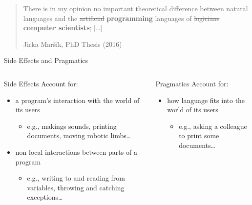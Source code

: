 \documentclass{beamer}
\begin{document}
\begin{frame}
  \begin{center}
    \begin{quotation}
      There is in my opinion no important theoretical difference between
      natural languages and the \sout{artificial} \textbf{programming}
      languages of \sout{logicians} \textbf{computer scientists}; [\ldots]

      \raggedleft \textup{Jirka Maršík}, PhD Thesis (2016)
    \end{quotation}
  \end{center}
\end{frame}


\begin{frame}{Side Effects and Pragmatics}
  \begin{columns}
    \begin{column}{0.5\textwidth}
   \begin{block}{Side Effects}
   Account for:
  \pause
  \vfill
  \begin{itemize}
  \item a program's interaction with the world of its users
    \begin{itemize}
    \item e.g., makings sounds, printing documents, moving robotic limbs\ldots
    \end{itemize}
  \end{itemize}
  \pause
  \vfill
  \begin{itemize}
  \item non-local interactions between parts of a program
    \begin{itemize}
    \item e.g., writing to and reading from variables, throwing and
      catching exceptions\ldots
    \end{itemize}
  \end{itemize}
  \end{block}
   \pause
    \end{column}
    \begin{column}{0.5\textwidth}
      \begin{block}{Pragmatics}
        Account for:
        \pause
        \vfill
        \begin{itemize}
        \item how language fits into the world of its users
          \begin{itemize}
          \item e.g., asking a colleague to print some documents\ldots

\end{itemize}
\end{itemize}
\end{block}
\end{column}
\end{columns}
\end{frame}
\end{document}

